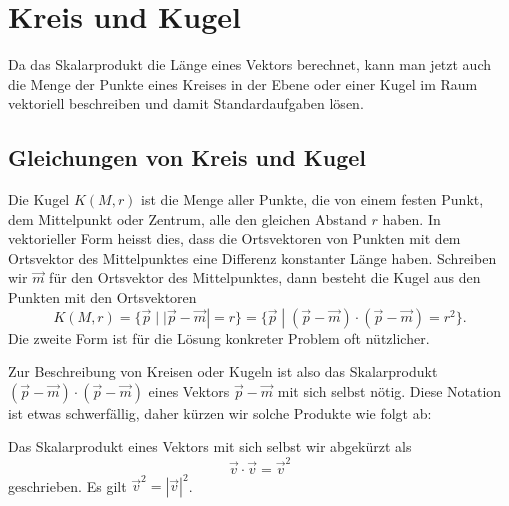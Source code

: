 %
%
%
\section{Kreis und Kugel\label{section:kreisundkugel}}
Da das Skalarprodukt die Länge eines Vektors berechnet, kann man
jetzt auch die Menge der Punkte eines Kreises in der Ebene
oder einer Kugel im Raum vektoriell beschreiben und damit Standardaufgaben
lösen.

%
%
\subsection{Gleichungen von Kreis und Kugel}
Die Kugel $K(M,r)$ ist die Menge aller Punkte, die von einem festen Punkt, dem
Mittelpunkt oder Zentrum, alle den gleichen Abstand $r$ haben.
In vektorieller
Form heisst dies, dass die Ortsvektoren von Punkten mit dem Ortsvektor des
Mittelpunktes eine Differenz konstanter Länge haben.
Schreiben wir $\vec m$
für den Ortsvektor des Mittelpunktes, dann besteht die Kugel aus den
Punkten mit den Ortsvektoren
\[
K(M,r)
=
\{\vec p\;| \;|\vec p-\vec m|=r\}
=
\{\vec p\;| \;(\vec p-\vec m)\cdot(\vec p-\vec m)=r^2\}.
\]
Die zweite Form ist für die Lösung konkreter Problem oft nützlicher.

Zur Beschreibung von Kreisen oder Kugeln ist also das Skalarprodukt
$(\vec{p}-\vec{m})\cdot(\vec{p}-\vec{m})$ eines Vektors $\vec{p}-\vec{m}$
mit sich selbst nötig.
Diese Notation ist etwas schwerfällig, daher kürzen wir solche Produkte
wie folgt ab:

\begin{definition}
Das Skalarprodukt eines Vektors mit sich selbst wir abgekürzt als
\[
\vec{v}\cdot\vec{v} = \vec{v}^2
\]
geschrieben.
Es gilt $\vec{v}^2 = |\vec{v}|^2$.
\end{definition}

%
%
